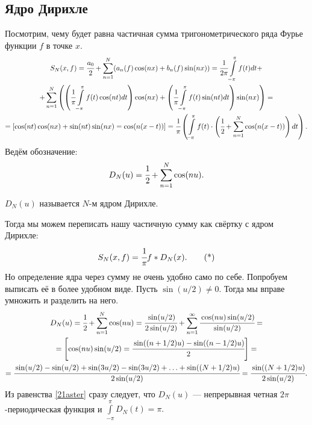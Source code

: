\subsection{Ядро Дирихле}
Посмотрим, чему будет равна частичная сумма тригонометрического ряда Фурье функции $f$ в точке $x$.
\begin{gather}
	S_N(x,f) = \cfrac{a_0}{2} + \sum\limits_{n=1}^{N}(a_n(f) \cos(nx) + b_n(f) \sin(nx)) = \cfrac{1}{2\pi}\int\limits_{-\pi}^{\pi} f(t)dt +\\
	+\sum\limits_{n=1}^{N}\left(\left( \cfrac{1}{\pi}\int\limits_{-\pi}^{\pi}f(t)\cos(nt) dt\right)\cos(nx) +
	\left( \cfrac{1}{\pi}\int\limits_{-\pi}^{\pi}f(t)\sin(nt) dt\right)\sin(nx) \right) = \\
	= [\cos(nt)\cos(nx) + \sin(nt)\sin(nx) = \cos(n(x-t))] 
	=\cfrac{1}{\pi}\left( \int\limits_{-\pi}^{\pi}f(t) \cdot \left( \cfrac{1}{2} + \sum \limits_{n=1}^{N}\cos(n(x-t))\right)dt\right).
\end{gather}
Ведём обозначение:
$$
	D_N(u) = \cfrac{1}{2} + \sum\limits_{n=1}^{N}\cos (nu).
$$
\begin{Def}
	$D_N(u)$ называется $N$-м ядром Дирихле. 
\end{Def}
Тогда мы можем переписать нашу частичную сумму как свёртку с ядром Дирихле:
\[
	S_N(x, f) = \cfrac{1}{\pi} f*D_N(x).\tag{*}
    \label{21aster}
\]
Но определение ядра через сумму не очень удобно само по себе. Попробуем выписать её в более удобном виде. Пусть $\sin(u/2) \neq 0$. Тогда мы вправе умножить и разделить на него.
\begin{gather}
	D_N(u) = \cfrac{1}{2} + \sum\limits_{n=1}^{N}\cos(nu) = \cfrac{\sin(u/2)}{2\sin(u/2)} + \sum\limits_{n=1}^{\infty} \cfrac{\cos(nu)\sin(u/2)}{\sin(u/2)} =\\
	= \left[\cos(nu)\sin(u/2) = \cfrac{\sin((n + 1/2)u) - \sin((n-1/2)u)}{2}\right]=\\
	= \cfrac{\sin(u/2) - \sin(u/2) + \sin(3u/2) - \sin(3u/2) + \ldots + \sin((N + 1/2)u)}{2\sin(u/2)} = \cfrac{\sin((N + 1/2)u)}{2\sin(u/2)}.
\end{gather}
Из равенства \eqref{21aster} сразу следует, что $D_N(u)$ --- непрерывная четная $2\pi$-периодическая функция и $\int\limits_{-\pi}^{\pi}D_N(t) = \pi.$